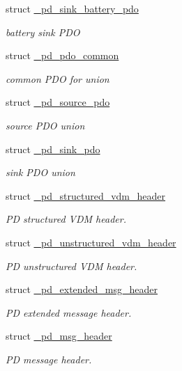 \begin{DoxyCompactItemize}
struct \hyperlink{struct__pd__sink__battery__pdo}{\-\_\-pd\-\_\-sink\-\_\-battery\-\_\-pdo}
\begin{DoxyCompactList}\small\item\em battery sink P\-D\-O \end{DoxyCompactList}\item 
struct \hyperlink{struct__pd__pdo__common}{\-\_\-pd\-\_\-pdo\-\_\-common}
\begin{DoxyCompactList}\small\item\em common P\-D\-O for union \end{DoxyCompactList}\item 
struct \hyperlink{struct__pd__source__pdo}{\-\_\-pd\-\_\-source\-\_\-pdo}
\begin{DoxyCompactList}\small\item\em source P\-D\-O union \end{DoxyCompactList}\item 
struct \hyperlink{struct__pd__sink__pdo}{\-\_\-pd\-\_\-sink\-\_\-pdo}
\begin{DoxyCompactList}\small\item\em sink P\-D\-O union \end{DoxyCompactList}\item 
struct \hyperlink{struct__pd__structured__vdm__header}{\-\_\-pd\-\_\-structured\-\_\-vdm\-\_\-header}
\begin{DoxyCompactList}\small\item\em P\-D structured V\-D\-M header. \end{DoxyCompactList}\item 
struct \hyperlink{struct__pd__unstructured__vdm__header}{\-\_\-pd\-\_\-unstructured\-\_\-vdm\-\_\-header}
\begin{DoxyCompactList}\small\item\em P\-D unstructured V\-D\-M header. \end{DoxyCompactList}\item 
struct \hyperlink{struct__pd__extended__msg__header}{\-\_\-pd\-\_\-extended\-\_\-msg\-\_\-header}
\begin{DoxyCompactList}\small\item\em P\-D extended message header. \end{DoxyCompactList}\item 
struct \hyperlink{struct__pd__msg__header}{\-\_\-pd\-\_\-msg\-\_\-header}
\begin{DoxyCompactList}\small\item\em P\-D message header. \end{DoxyCompactList}\item 

\end{DoxyCompactItemize}
